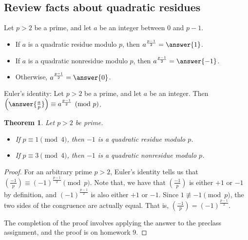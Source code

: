 \documentclass{ximera}
\theoremstyle{plain}
\newtheorem{thm}{Theorem}
\begin{document}
\subsection{Review facts about quadratic residues}
\begin{question}
 Let $p>2$ be a prime, and let $a$ be an integer between $0$ and $p-1$.
 
\begin{itemize}
 \item If $a$ is a quadratic residue modulo $p$, then $a^{\frac{p-1}{2}}=\answer{1}
 $.
 \item If $a$ is a quadratic nonresidue modulo $p$, then $a^{\frac{p-1}{2}}=\answer{-1}
 $.
 \item Otherwise, $a^{\frac{p-1}{2}}=\answer{0}
 $.
\end{itemize}
\end{question}

\begin{question}
 Euler's identity:  Let $p>2$ be a prime, and let $a$ be an integer. Then $\left(\answer{\frac{a}{p}}
 \right)\equiv a^{\frac{p-1}{2}} \pmod p$.
\end{question}

\begin{thm}
 Let $p>2$ be prime.
\begin{itemize}
 \item If $p\equiv 1 \pmod 4$, then $-1$ is a quadratic residue modulo $p$.
 \item If $p\equiv 3 \pmod 4$, then $-1$ is a quadratic nonresidue modulo $p$.
\end{itemize}
\end{thm}
\begin{proof}
 For an arbitrary prime $p>2$, Euler's identity tells us that $\left(\frac{-1}{p}\right)\equiv (-1)^{\frac{p-1}{2}} \pmod p$. Note that, we have that $\left(\frac{-1}{p}\right)$ is either $+1$ or $-1$ by definition, and $(-1)^{\frac{p-1}{2}}$ is also either $+1$ or $-1$. Since $1\not\equiv -1 \pmod p$, the two sides of the congruence are actually equal. That is, $\left(\frac{-1}{p}\right)= (-1)^{\frac{p-1}{2}} $.
 
 The completion of the proof involves applying the answer to the preclass assignment, and the proof is on homework 9.
 \end{proof}
 
\end{document}
